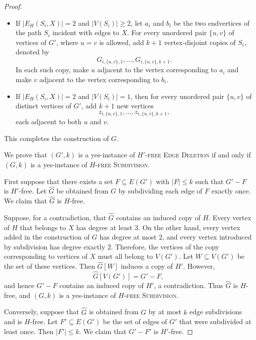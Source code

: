 \documentclass[a4paper,UKenglish,cleveref, autoref, thm-restate]{lipics-v2021}
\begin{document}
\begin{proof}
\begin{itemize}
    \item If $|E_H(S_i,X)|=2$ and $|V(S_i)|\geq 2$, let $a_i$ and $b_i$ be the
    two endvertices of the path $S_i$ incident with edges to $X$.
    For every unordered pair $\{u,v\}$ of vertices of $G'$, where $u=v$ is
    allowed, add $k+1$ vertex-disjoint copies of $S_i$, denoted by
    \[
        G_{i,\{u,v\},1},\ldots,G_{i,\{u,v\},k+1}.
    \]
    In each such copy, make $u$ adjacent to the vertex corresponding to $a_i$
    and make $v$ adjacent to the vertex corresponding to $b_i$.

    \item If $|E_H(S_i,X)|=2$ and $|V(S_i)|=1$, then for every unordered pair
    $\{u,v\}$ of distinct vertices of $G'$, add $k+1$ new vertices
    \[
        z_{i,\{u,v\},1},\ldots,z_{i,\{u,v\},k+1},
    \]
    each adjacent to both $u$ and $v$.
\end{itemize}

This completes the construction of $G$.

We prove that $(G',k)$ is a yes-instance of \textsc{$H'$-free Edge Deletion} if
and only if $(G,k)$ is a yes-instance of \textsc{$H$-free Subdivision}.

First suppose that there exists a set $F\subseteq E(G')$ with $|F|\leq k$ such
that $G'-F$ is $H'$-free.
Let $\widehat{G}$ be obtained from $G$ by subdividing each edge of $F$ exactly
once.
We claim that $\widehat{G}$ is $H$-free.

Suppose, for a contradiction, that $\widehat{G}$ contains an induced copy of
$H$.
Every vertex of $H$ that belongs to $X$ has degree at least $3$.
On the other hand, every vertex added in the construction of $G$ has degree at
most $2$, and every vertex introduced by subdivision has degree exactly $2$.
Therefore, the vertices of the copy corresponding to vertices of $X$ must all
belong to $V(G')$.
Let $W\subseteq V(G')$ be the set of these vertices.
Then $\widehat{G}[W]$ induces a copy of $H'$.
However,
\[
    \widehat{G}[V(G')]=G'-F,
\]
and hence $G'-F$ contains an induced copy of $H'$, a contradiction.
Thus $\widehat{G}$ is $H$-free, and $(G,k)$ is a yes-instance of
\textsc{$H$-free Subdivision}.

Conversely, suppose that $\widehat{G}$ is obtained from $G$ by at most $k$ edge
subdivisions and is $H$-free.
Let $F'\subseteq E(G')$ be the set of edges of $G'$ that were subdivided at
least once.
Then $|F'|\leq k$.
We claim that $G'-F'$ is $H'$-free.


\end{proof}
\end{document}
